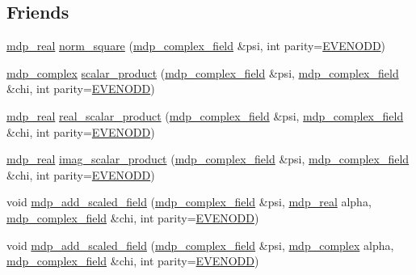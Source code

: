 \subsection*{Friends}
\begin{DoxyCompactItemize}
\item 
\hyperlink{mdp__global__vars_8h_a69d96b74c791e0bbdb888b3913a69450}{mdp\+\_\+real} \hyperlink{classmdp__complex__field_a81ccdc6212b7084b9fe17249438abe6e}{norm\+\_\+square} (\hyperlink{classmdp__complex__field}{mdp\+\_\+complex\+\_\+field} \&psi, int parity=\hyperlink{mdp__global__vars_8h_a4c9de81f2de5a74b588107b6c0afb9ee}{E\+V\+E\+N\+O\+DD})
\item 
\hyperlink{classmdp__complex}{mdp\+\_\+complex} \hyperlink{classmdp__complex__field_a7a6ea38341405f2cc4e771b33b4ea38f}{scalar\+\_\+product} (\hyperlink{classmdp__complex__field}{mdp\+\_\+complex\+\_\+field} \&psi, \hyperlink{classmdp__complex__field}{mdp\+\_\+complex\+\_\+field} \&chi, int parity=\hyperlink{mdp__global__vars_8h_a4c9de81f2de5a74b588107b6c0afb9ee}{E\+V\+E\+N\+O\+DD})
\item 
\hyperlink{mdp__global__vars_8h_a69d96b74c791e0bbdb888b3913a69450}{mdp\+\_\+real} \hyperlink{classmdp__complex__field_a0d9771f5d1f057270e5568519a796a0c}{real\+\_\+scalar\+\_\+product} (\hyperlink{classmdp__complex__field}{mdp\+\_\+complex\+\_\+field} \&psi, \hyperlink{classmdp__complex__field}{mdp\+\_\+complex\+\_\+field} \&chi, int parity=\hyperlink{mdp__global__vars_8h_a4c9de81f2de5a74b588107b6c0afb9ee}{E\+V\+E\+N\+O\+DD})
\item 
\hyperlink{mdp__global__vars_8h_a69d96b74c791e0bbdb888b3913a69450}{mdp\+\_\+real} \hyperlink{classmdp__complex__field_a0671bd0b418f625c07f3ba9135e26b12}{imag\+\_\+scalar\+\_\+product} (\hyperlink{classmdp__complex__field}{mdp\+\_\+complex\+\_\+field} \&psi, \hyperlink{classmdp__complex__field}{mdp\+\_\+complex\+\_\+field} \&chi, int parity=\hyperlink{mdp__global__vars_8h_a4c9de81f2de5a74b588107b6c0afb9ee}{E\+V\+E\+N\+O\+DD})
\item 
void \hyperlink{classmdp__complex__field_adebe165924543c988d0c7e86da4b2eb3}{mdp\+\_\+add\+\_\+scaled\+\_\+field} (\hyperlink{classmdp__complex__field}{mdp\+\_\+complex\+\_\+field} \&psi, \hyperlink{mdp__global__vars_8h_a69d96b74c791e0bbdb888b3913a69450}{mdp\+\_\+real} alpha, \hyperlink{classmdp__complex__field}{mdp\+\_\+complex\+\_\+field} \&chi, int parity=\hyperlink{mdp__global__vars_8h_a4c9de81f2de5a74b588107b6c0afb9ee}{E\+V\+E\+N\+O\+DD})
\item 
void \hyperlink{classmdp__complex__field_aeb331a3604fa5d1e30e726958e2cc21f}{mdp\+\_\+add\+\_\+scaled\+\_\+field} (\hyperlink{classmdp__complex__field}{mdp\+\_\+complex\+\_\+field} \&psi, \hyperlink{classmdp__complex}{mdp\+\_\+complex} alpha, \hyperlink{classmdp__complex__field}{mdp\+\_\+complex\+\_\+field} \&chi, int parity=\hyperlink{mdp__global__vars_8h_a4c9de81f2de5a74b588107b6c0afb9ee}{E\+V\+E\+N\+O\+DD})

\end{DoxyCompactItemize}
